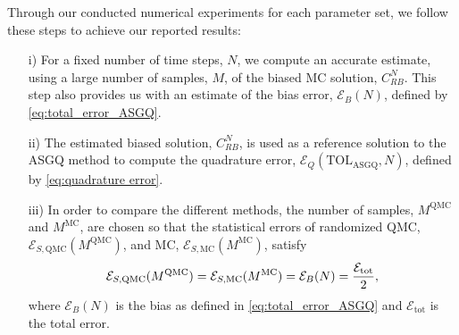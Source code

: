 Through our conducted numerical experiments for each parameter set, we follow these steps to achieve our reported results:
\begin{enumerate}
\item[i)] For a fixed number of time steps, $N$, we compute an accurate estimate, using a large number of samples, $M$, of the biased  MC solution, $C_{RB}^{N}$. This step also provides us with an estimate of the bias error, $\mathcal{E}_B(N)$, defined by \eqref{eq:total_error_ASGQ}. 
\item[ii)] The estimated  biased solution,  $C_{RB}^{N}$, is used as a reference solution  to the ASGQ method to compute the quadrature error, $\mathcal{E}_Q(\text{TOL}_{\text{ASGQ}},N)$, defined by \eqref{eq:quadrature error}.
\item[iii)] In order to compare the different methods, the number of samples, $M^{\text{QMC}}$ and $M^{\text{MC}}$, are chosen so that  the statistical errors of randomized QMC, $\mathcal{E}_{S,\text{QMC}}(M^{\text{QMC}})$, and MC, $\mathcal{E}_{S,\text{MC}}(M^{\text{MC}})$, satisfy
\begin{align}\label{optimal_number_samples}
\mathcal{E}_{S,\text{QMC}}(M^{\text{QMC}})=\mathcal{E}_{S,\text{MC}}(M^{\text{MC}})= \mathcal{E}_B(N)=\frac{\mathcal{E}_{\text{tot}}}{2},
\end{align}
where $\mathcal{E}_B(N)$ is the bias as defined in \eqref{eq:total_error_ASGQ} and
$\mathcal{E}_{\text{tot}}$ is the total error. 
\end{enumerate}

